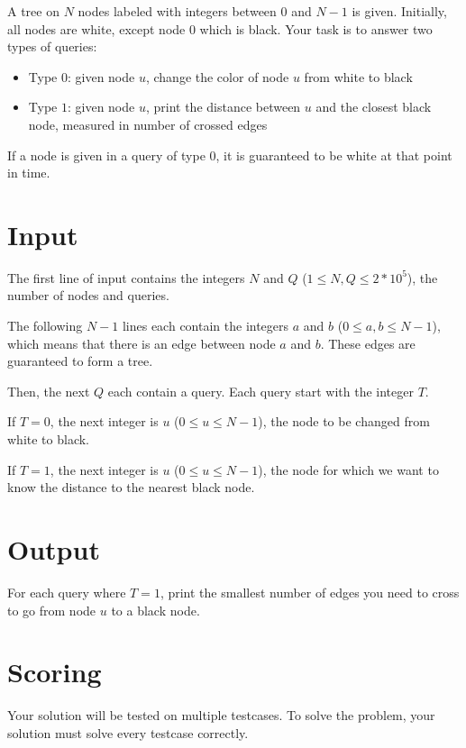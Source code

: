 A tree on $N$ nodes labeled with integers between $0$ and $N-1$ is given. Initially, all nodes are white,
except node $0$ which is black. Your task is to answer two types of queries:

\begin{itemize}
    \item Type $0$: given node $u$, change the color of node $u$ from white to black
    \item Type $1$: given node $u$, print the distance between $u$ and the closest black node, measured in number of crossed edges
\end{itemize}

If a node is given in a query of type $0$, it is guaranteed to be white at that point in time.


\section*{Input}
The first line of input contains the integers $N$ and $Q$ ($1 \leq N,Q \leq 2*10^5$), the number of nodes and queries.

The following $N-1$ lines each contain the integers $a$ and $b$ ($0 \leq a,b \leq N-1$), which means that
there is an edge between node $a$ and $b$. These edges are guaranteed to form a tree.

Then, the next $Q$ each contain a query. Each query start with the integer $T$.

If $T=0$, the next integer is $u$ ($0 \leq u \leq N-1$), the node to be changed from white to black.

If $T=1$, the next integer is $u$ ($0 \leq u \leq N-1$), the node for which we want to know the distance to the nearest black node.

\section*{Output}
For each query where $T=1$, print the smallest number of edges you need to cross to go from node $u$ to a black node.

\section*{Scoring}
Your solution will be tested on multiple testcases.
\noindent
To solve the problem, your solution must solve every testcase correctly.
